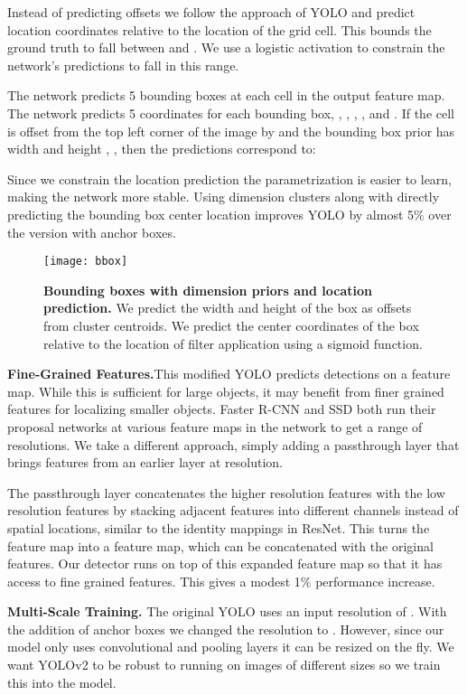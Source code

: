 \documentclass[10pt,twocolumn,letterpaper]{article}
\begin{document}
Instead of predicting offsets we follow the approach of YOLO and predict location coordinates relative to the location of the grid cell. This bounds the ground truth to fall between  and . We use a logistic activation to constrain the network's predictions to fall in this range.

The network predicts 5 bounding boxes at each cell in the output feature map. The network predicts 5 coordinates for each bounding box, , , , , and . If the cell is offset from the top left corner of the image by  and the bounding box prior has width and height , , then the predictions correspond to:



Since we constrain the location prediction the parametrization is easier to learn, making the network more stable. Using dimension clusters along with directly predicting the bounding box center location improves YOLO by almost 5\% over the version with anchor boxes.

\begin{figure}[t]
      \centering
        \texttt{[image: bbox]}
      \caption{\small \textbf{Bounding boxes with dimension priors and location prediction.} We predict the width and height of the box as offsets from cluster centroids. We predict the center coordinates of the box relative to the location of filter application using a sigmoid function. }
      \label{box}
   \end{figure}

\textbf{Fine-Grained Features.}This modified YOLO predicts detections on a  feature map. While this is sufficient for large objects, it may benefit from finer grained features for localizing smaller objects. Faster R-CNN and SSD both run their proposal networks at various feature maps in the network to get a range of resolutions. We take a different approach, simply adding a passthrough layer that brings features from an earlier layer at  resolution.

The passthrough layer concatenates the higher resolution features with the low resolution features by stacking adjacent features into different channels instead of spatial locations, similar to the identity mappings in ResNet. This turns the  feature map into a  feature map, which can be concatenated with the original features. Our detector runs on top of this expanded feature map so that it has access to fine grained features. This gives a modest 1\% performance increase.

\textbf{Multi-Scale Training.} The original YOLO uses an input resolution of . With the addition of anchor boxes we changed the resolution to . However, since our model only uses convolutional and pooling layers it can be resized on the fly. We want YOLOv2 to be robust to running on images of different sizes so we train this into the model.
\end{document}
